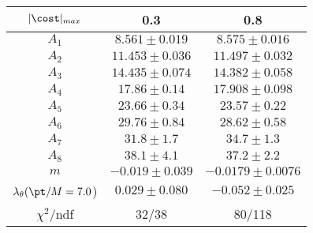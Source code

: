 \begin{tabular}{c|c|c}
$|\cost|_{max}$ & 0.3 & 0.8\\
\hline
$A_1$ & $8.561\pm0.019$ & $8.575\pm0.016$ \\
$A_2$ & $11.453\pm0.036$ & $11.497\pm0.032$ \\
$A_3$ & $14.435\pm0.074$ & $14.382\pm0.058$ \\
$A_4$ & $17.86\pm0.14$ & $17.908\pm0.098$ \\
$A_5$ & $23.66\pm0.34$ & $23.57\pm0.22$ \\
$A_6$ & $29.76\pm0.84$ & $28.62\pm0.58$ \\
$A_7$ & $31.8\pm1.7$ & $34.7\pm1.3$ \\
$A_8$ & $38.1\pm4.1$ & $37.2\pm2.2$ \\
$m$ & $-0.019\pm0.039$ & $-0.0179\pm0.0076$ \\
$\lambda_\theta(\pt/M = 7.0$) & $0.029\pm0.080$ & $-0.052\pm0.025$ \\
\hline
$\chi^2$/ndf & 32/38 & 80/118
\end{tabular}
